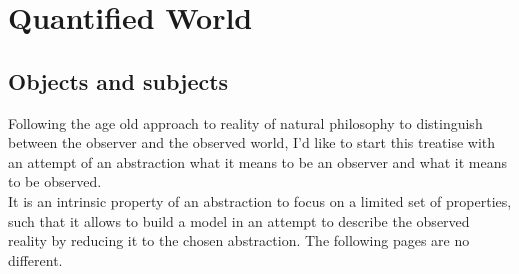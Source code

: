 \section{Quantified World}
\subsection{Objects and subjects}
Following the age old approach to reality of natural philosophy to distinguish between the observer and the observed world, I'd like to start this treatise with an attempt of an abstraction what it means to be an observer and what it means to be observed.\\
It is an intrinsic property of an abstraction to focus on a limited set of properties, such that it allows to build a model in an attempt to describe the observed reality by reducing it to the chosen abstraction. The following pages are no different.\\

